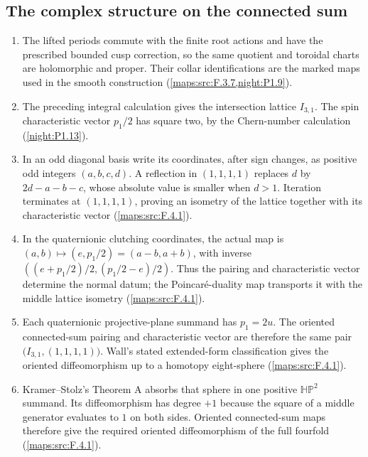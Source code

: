 \subsection{The complex structure on the connected sum}
\RungOne
\begin{enumerate}[label=\arabic*.]
\item The lifted periods commute with the finite root actions and
  have the prescribed bounded cusp correction, so the same quotient
  and toroidal charts are holomorphic and proper.  Their collar
  identifications are the marked maps used in the smooth construction
  (\cref{maps:src:F.3.7,night:P1.9}).
\item The preceding integral calculation gives the intersection
  lattice $I_{3,1}$.  The spin characteristic vector $p_1/2$ has
  square two, by the Chern-number calculation
  (\cref{night:P1.13}).
\item In an odd diagonal basis write its coordinates, after sign
  changes, as positive odd integers $(a,b,c,d)$.  A reflection in
  $(1,1,1,1)$ replaces $d$ by $2d-a-b-c$, whose absolute value is
  smaller when $d>1$.  Iteration terminates at $(1,1,1,1)$, proving
  an isometry of the lattice together with its characteristic vector
  (\cref{maps:src:F.4.1}).
\item In the quaternionic clutching coordinates, the actual map is
  $(a,b)\mapsto(e,p_1/2)=(a-b,a+b)$, with inverse
  $((e+p_1/2)/2,(p_1/2-e)/2)$.  Thus the pairing and characteristic
  vector determine the normal datum; the Poincar\'e-duality map
  transports it with the middle lattice isometry
  (\cref{maps:src:F.4.1}).
\item Each quaternionic projective-plane summand has $p_1=2u$.
  The oriented connected-sum pairing and characteristic vector are
  therefore the same pair $\bigl(I_{3,1},(1,1,1,1)\bigr)$.
  Wall's stated extended-form classification gives the oriented
  diffeomorphism up to a homotopy eight-sphere
  (\cref{maps:src:F.4.1}).
\item Kramer--Stolz's Theorem A absorbs that sphere in one positive
  $\mathbb{HP}^2$ summand.  Its diffeomorphism has degree $+1$ because
  the square of a middle generator evaluates to $1$ on both sides.
  Oriented connected-sum maps therefore give the required oriented
  diffeomorphism of the full fourfold
  (\cref{maps:src:F.4.1}).
\end{enumerate}

